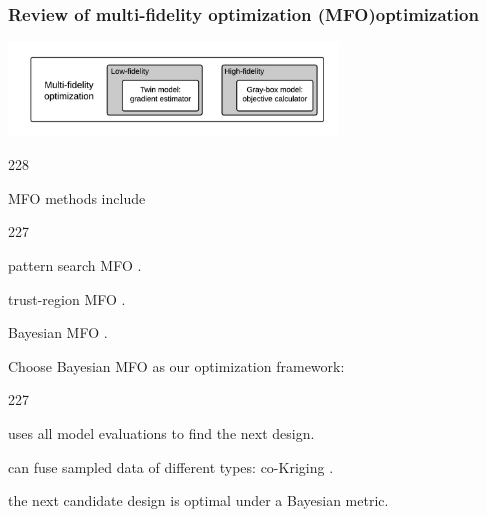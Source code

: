 \documentclass{beamer}
\let\oldcite=\cite
\renewcommand{\cite}[1]{\textcolor[rgb]{.4,.4,.85}{\oldcite{#1}}}
\newcommand{\barrow}{\item[\color{darkred}\ding{228}]}
\newcommand{\carrow}{\item[\color{darkred}\ding{227}]}
\begin{document}
\begin{frame}
    \frametitle{Review of multi-fidelity optimization (MFO)\hfill \scriptsize{optimization}}\small
    \vspace{-.4cm}
    \begin{center}
        \includegraphics[height=2.5cm]{mfo.png}
    \end{center}
    \vspace{-.4cm}
    \begin{dinglist}{228}
    \vspace{-.2cm}
    \barrow MFO methods include\vspace{.1cm}
               \begin{dinglist}{227}
                   \carrow pattern search MFO \scriptsize \cite{Booker 99}. \vspace{0.1cm}
                   \small
                   \carrow trust-region MFO \scriptsize \cite{Wild 13, March 12, Robinson 06}.\vspace{.1cm}
                   \small
                   \carrow Bayesian MFO \scriptsize \cite{Kennedy 01, March 11}.
               \end{dinglist}
    \vspace{.12cm}
    \barrow Choose Bayesian MFO as our optimization framework:\vspace{.1cm}
               \begin{dinglist}{227}
                   \small
                   \carrow uses all model evaluations to find the next design.\vspace{.1cm}
                   \small
                   \carrow can fuse sampled data of different types: co-Kriging \scriptsize \cite{Chung 02}.\vspace{.1cm}
                   \small
                   \carrow the next candidate design is optimal under a Bayesian metric.\vspace{.1cm}
               \end{dinglist}
    \end{dinglist}
\end{frame}
\end{document}
